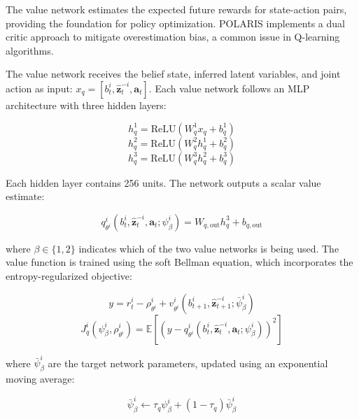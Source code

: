 \documentclass[a4paper,12pt]{report}
\begin{document}
The value network estimates the expected future rewards for state-action pairs, providing the foundation for policy optimization. POLARIS implements a dual critic approach to mitigate overestimation bias, a common issue in Q-learning algorithms.

The value network receives the belief state, inferred latent variables, and joint action as input: $x_{q} = [b^{i}_{t}, \hat{\boldsymbol{z}}^{-i}_{t}, \boldsymbol{a}_{t}]$. Each value network follows an MLP architecture with three hidden layers:

\begin{equation}
    h^1_{q} = \text{ReLU}(W^1_{q}x_{q} + b^1_{q})
\end{equation}
\begin{equation}
    h^2_{q} = \text{ReLU}(W^2_{q}h^1_{q} + b^2_{q})
\end{equation}
\begin{equation}
    h^3_{q} = \text{ReLU}(W^3_{q}h^2_{q} + b^3_{q})
\end{equation}

Each hidden layer contains 256 units. The network outputs a scalar value estimate:

\begin{equation}
    q^{i}_{\theta^i}(b^{i}_{t}, \hat{\boldsymbol{z}}^{-i}_{t}, \boldsymbol{a}_{t}; \psi^{i}_{\beta}) = W_{q,\text{out}}h^3_{q} + b_{q,\text{out}}
\end{equation}

where $\beta \in \{1, 2\}$ indicates which of the two value networks is being used. The value function is trained using the soft Bellman equation, which incorporates the entropy-regularized objective:

\begin{equation}
    y = r^{i}_{t} - \rho^{i}_{\theta^i} + v^{i}_{\theta^i}(b^{i}_{t+1}, \hat{\boldsymbol{z}}^{-i}_{t+1}; \bar{\psi}^{i}_{\beta})
\end{equation}
\begin{equation}
    J^{i}_{q}(\psi^{i}_{\beta}, \rho^{i}_{\theta^i}) = \mathbb{E}[(y - q^{i}_{\theta^i}(b^{i}_{t}, \hat{\boldsymbol{z}}^{-i}_{t}, \boldsymbol{a}_{t}; \psi^{i}_{\beta}))^{2}]
\end{equation}

where $\bar{\psi}^{i}_{\beta}$ are the target network parameters, updated using an exponential moving average:

\begin{equation}
    \bar{\psi}^{i}_{\beta} \leftarrow \tau_{q}\psi^{i}_{\beta} + (1 - \tau_{q})\bar{\psi}^{i}_{\beta}
\end{equation}
\end{document}
